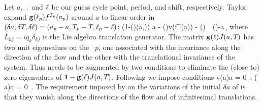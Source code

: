 Let
$a$, $\period{}$ and $\ell$
be our guess cycle point, period, and shift, respectively.
Taylor expand $\mathbf{g}(\ell_p)  {f^{{T_{p}}}(a_p)}$
around  $a$ to linear order in
$(\delta a,\delta {T_{}},\delta \ell)
   =(a_p-a,{T_{p}} - {T_{}},\ell_p-\ell)$:
\beq
    \left({1}-(\shift)\jMps(a,\period{})\right) \delta a
   - (\shift)v(f^{\period{}}(a)) \delta \period{}
                            - (\shift) \delta \shift
                    \,\simeq\, (\shift)-a\,,
    \label{eq:NewtonBasicCond}
\eeq
where %
$L_{kj}=i q_k \delta_{kj}$ is the Lie algebra translation
generator. The matrix $\mathbf{g}(\ell){J}(a,{T_{}})$
has two unit eigenvalues on the \rpo\ $p$,
one associated with the invariance along
the direction of the flow and the other with the
translational invariance of the system. Thus 
needs to be augmented by two conditions to
eliminate the (close to) zero eigenvalues of
$\mathbf{1}-\mathbf{g}(\ell){J}(a,{T_{}})$. Following
 we impose 
conditions
\beq
    v(a)\cdot\delta a  =  0
    \,,\qquad
    \left( a\right)\cdot \delta a  =  0
\,.
\label{eq:NewtonAux}
\eeq
The requirement imposed by 
on the variations of the initial $\delta a$ of 
is that they   vanish along the directions of the flow
and of infinitesimal translations.

